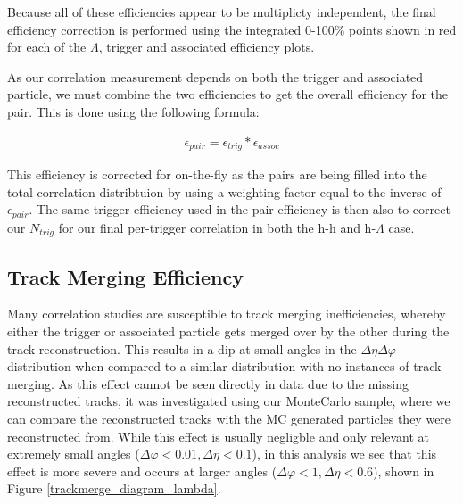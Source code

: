 \documentclass[ALICE,manyauthors]{ALICE_analysis_notes}
\begin{document}
\begin{itemize}
Because all of these efficiencies appear to be multiplicty independent, the final efficiency correction is performed using the integrated 0-100\% points shown in red for each of the $\Lambda$, trigger and associated efficiency plots.

As our correlation measurement depends on both the trigger and associated particle, we must combine the two efficiencies to get the overall efficiency for the pair.  This is done using the following formula:

\begin{align*}
    \epsilon_{pair} = \epsilon_{trig}*\epsilon_{assoc}
\end{align*}

This efficiency is corrected for on-the-fly as the pairs are being filled into the total correlation distribtuion by using a weighting factor equal to the inverse of $\epsilon_{pair}$. The same trigger efficiency used in the pair efficiency is then also to correct our $N_{trig}$ for our final per-trigger correlation in both the h-h and h-$\Lambda$ case.

\subsection{Track Merging Efficiency} 
\label{trackmerge_efficiency}

Many correlation studies are susceptible to track merging inefficiencies, whereby either the trigger or associated particle gets merged over by the other during the track reconstruction. This results in a dip at small angles in the $\Delta\eta\Delta\varphi$ distribution when compared to a similar distribution with no instances of track merging. As this effect cannot be seen directly in data due to the missing reconstructed tracks, it was investigated using our MonteCarlo sample, where we can compare the reconstructed tracks with the MC generated particles they were reconstructed from. While this effect is usually negligble and only relevant at extremely small angles ($\Delta\varphi < 0.01, \Delta\eta < 0.1$), in this analysis we see that this effect is more severe and occurs at larger angles ($\Delta\varphi < 1, \Delta\eta < 0.6$), shown in Figure \ref{trackmerge_diagram_lambda}. 


\end{itemize}
\end{document}
